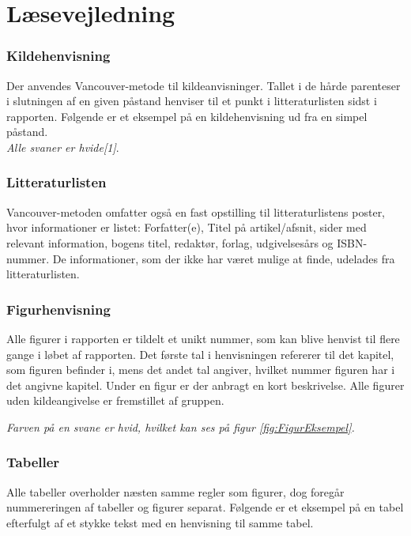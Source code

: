 \section*{Læsevejledning}
\label{sec:laesevejledning}

\subsubsection*{Kildehenvisning}
Der anvendes Vancouver-metode til kildeanvisninger. Tallet i de hårde parenteser i slutningen af en given påstand henviser til et punkt i litteraturlisten sidst i rapporten. Følgende er et eksempel på en kildehenvisning ud fra en simpel påstand.\\

\noindent \textit{Alle svaner er hvide\emph{[1]}}.

\subsubsection*{Litteraturlisten}
Vancouver-metoden omfatter også en fast opstilling til litteraturlistens poster, hvor informationer er listet: Forfatter(e), Titel på artikel/afsnit, sider med relevant information, bogens titel, redaktør, forlag, udgivelsesårs og ISBN-nummer. De informationer, som der ikke har været mulige at finde, udelades fra litteraturlisten.

\subsubsection*{Figurhenvisning}
Alle figurer i rapporten er tildelt et unikt nummer, som kan blive henvist til flere gange i løbet af rapporten. Det første tal i henvisningen refererer til det kapitel, som figuren befinder i, mens det andet tal angiver, hvilket nummer figuren har i det angivne kapitel. Under en figur er der anbragt en kort beskrivelse. Alle figurer uden kildeangivelse er fremstillet af gruppen.


\noindent \textit{Farven på en svane er hvid, hvilket kan ses på figur \ref{fig:FigurEksempel}.}

\subsubsection*{Tabeller}
Alle tabeller overholder næsten samme regler som figurer, dog foregår nummereringen af tabeller og figurer separat. Følgende er et eksempel på en tabel efterfulgt af et stykke tekst med en henvisning til samme tabel.

